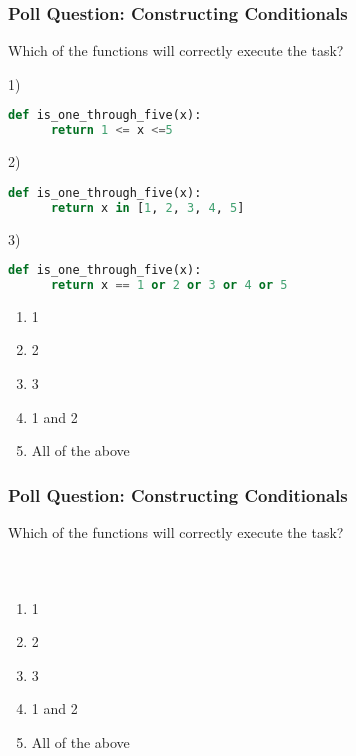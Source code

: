 \documentclass{beamer}
\begin{document}
%
%
\begin{frame}[fragile]
	\frametitle{Poll Question: Constructing Conditionals}
  Which of the functions will correctly execute the task?
	\begin{minipage}{0.7\textwidth}
    1)
		\begin{lstlisting}[language=Python, autogobble,basicstyle=\tiny,numbers=none]
    def is_one_through_five(x):
      return 1 <= x <=5
		\end{lstlisting}
    2)
		\begin{lstlisting}[language=Python, autogobble,basicstyle=\tiny,numbers=none]
    def is_one_through_five(x):
      return x in [1, 2, 3, 4, 5]
		\end{lstlisting}
    3)
		\begin{lstlisting}[language=Python, autogobble,basicstyle=\tiny,numbers=none]
    def is_one_through_five(x):
      return x == 1 or 2 or 3 or 4 or 5
		\end{lstlisting}
	\end{minipage}
  \begin{minipage}{0.29\textwidth}
    \begin{enumerate}[A]
      \item 1
      \item 2
      \item 3
      \item 1 and 2
      \item All of the above
    \end{enumerate}
	\end{minipage}
\end{frame}


%
%
\begin{frame}[fragile]
	\frametitle{Poll Question: Constructing Conditionals}
  Which of the functions will correctly execute the task?
	\vfill
	\begin{minipage}{0.32\textwidth}
		\begin{lstlisting}[language=Python, autogobble,basicstyle=\tiny,numbers=none]
		\end{lstlisting}
	\end{minipage}
	\begin{minipage}{0.32\textwidth}
		\begin{lstlisting}[language=Python, autogobble,basicstyle=\tiny,numbers=none]
		\end{lstlisting}
	\end{minipage}
	\begin{minipage}{0.32\textwidth}
		\begin{lstlisting}[language=Python, autogobble,basicstyle=\tiny,numbers=none]
		\end{lstlisting}
	\end{minipage}
	\vfill
	\begin{enumerate}[A]
    \item 1
    \item 2
    \item 3
    \item 1 and 2
    \item All of the above
	\end{enumerate}
\end{frame}
\end{document}

